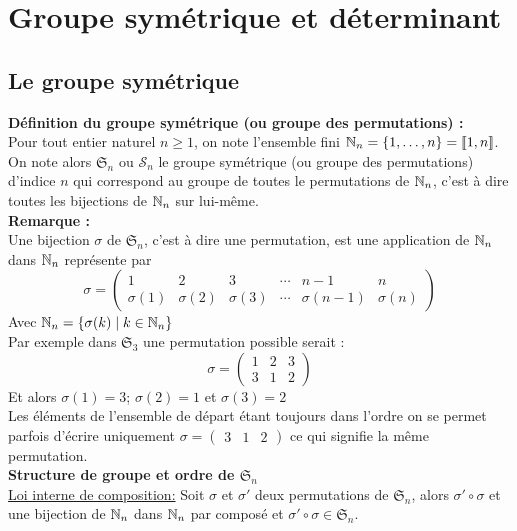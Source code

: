 	\section{Groupe symétrique et déterminant}
	\subsection{Le groupe symétrique}
	\textbf{Définition du groupe symétrique (ou groupe des permutations) :}\\
	Pour tout entier naturel $n\geq 1$, on note l'ensemble fini $\mathbb{N}_n=\{1,\dots,n\}=\llbracket 1,n \rrbracket$.\\ On note alors $\mathfrak{S}_n$ ou $\mathcal{S}_n$ le groupe symétrique (ou groupe des permutations) d'indice $n$ qui correspond au groupe de toutes le permutations de $\mathbb{N}_n$, c'est à dire toutes les bijections de $\mathbb{N}_n$ sur lui-même.\\
	
	\textbf{Remarque :}\\
	Une bijection $\sigma$ de $\mathfrak{S}_n$, c'est à dire une permutation, est une application de $\mathbb{N}_n$ dans $\mathbb{N}_n$ représente par \[
	\sigma = 
	\begin{pmatrix}
		1 & 2 & 3 & \cdots & n-1 & n \\
		\sigma(1) & \sigma(2) & \sigma(3) & \cdots &  \sigma(n-1)  & \sigma(n)
	\end{pmatrix}
	\]
	Avec $\mathbb{N}_n=\{\sigma(k)\mid k\in \mathbb{N}_n\}$\\
	
	Par exemple dans $\mathfrak{S}_3$ une permutation possible serait :	
	\[
	\sigma = 
	\begin{pmatrix}
		1 & 2 & 3 \\
		3 & 1 & 2
	\end{pmatrix}
	\]
	Et alors $\sigma(1)=3$; $\sigma(2)=1$ et $\sigma(3)=2$\\
	Les éléments de l'ensemble de départ étant toujours dans l'ordre on se permet parfois d'écrire uniquement $\sigma=	\begin{pmatrix}
		3 & 1 & 2
	\end{pmatrix}$ ce qui signifie la même permutation.\\

\textbf{Structure de groupe et ordre de $\mathfrak{S}_n$}\\

\underline{Loi interne de composition:} Soit $\sigma$ et $\sigma'$ deux permutations de $\mathfrak{S}_n$,
alors $\sigma'\circ\sigma$ et une bijection de $\mathbb{N}_n$ dans $\mathbb{N}_n$ par composé et $\sigma'\circ\sigma\in\mathfrak{S}_n$.\\

